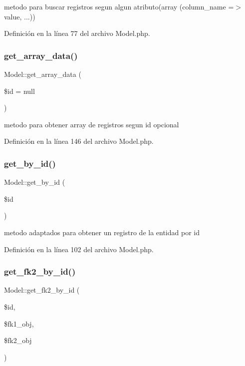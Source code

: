 metodo para buscar registros segun algun atributo(array (column\+\_\+name =$>$ value, ...)) 

Definición en la línea 77 del archivo Model.\+php.

\mbox{\label{class_model_a62dd5265f2009c4111dc8117f815eb27}} 
\subsubsection{\texorpdfstring{get\_array\_data()}{get\_array\_data()}}
{\footnotesize\ttfamily Model\+::get\+\_\+array\+\_\+data (\begin{DoxyParamCaption}\item[{}]{\$id = {\ttfamily null} }\end{DoxyParamCaption})}

metodo para obtener array de registros segun id opcional 

Definición en la línea 146 del archivo Model.\+php.

\mbox{\label{class_model_a708a0fc588b55e650ea0847da98f7b80}} 
\subsubsection{\texorpdfstring{get\_by\_id()}{get\_by\_id()}}
{\footnotesize\ttfamily Model\+::get\+\_\+by\+\_\+id (\begin{DoxyParamCaption}\item[{}]{\$id }\end{DoxyParamCaption})}

metodo adaptados para obtener un registro de la entidad por id 

Definición en la línea 102 del archivo Model.\+php.

\mbox{\label{class_model_af5ccad2ad89087e4454e71787163a6ba}} 
\subsubsection{\texorpdfstring{get\_fk2\_by\_id()}{get\_fk2\_by\_id()}}
{\footnotesize\ttfamily Model\+::get\+\_\+fk2\+\_\+by\+\_\+id (\begin{DoxyParamCaption}\item[{}]{\$id,  }\item[{}]{\$fk1\+\_\+obj,  }\item[{}]{\$fk2\+\_\+obj }\end{DoxyParamCaption})}


